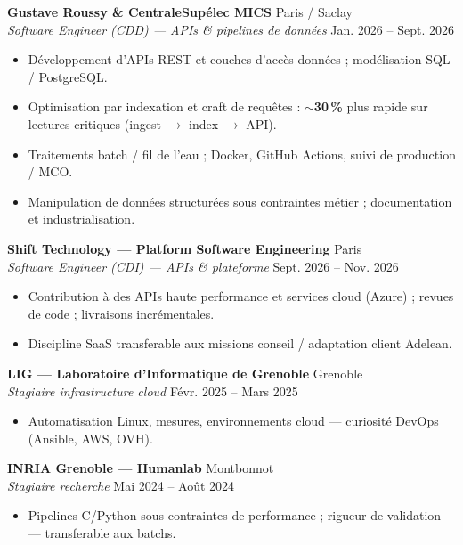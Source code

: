 \documentclass[10pt,a4paper]{article}
\begin{document}
\textbf{Gustave Roussy \& CentraleSup\'elec MICS} \hfill Paris / Saclay\\
\textit{Software Engineer (CDD) --- APIs \& pipelines de donn\'ees} \hfill Jan. 2026 -- Sept. 2026
\begin{itemize}
  \item D\'eveloppement d'APIs REST et couches d'acc\`es donn\'ees ; mod\'elisation SQL / PostgreSQL.
  \item Optimisation par indexation et craft de requ\^etes : $\sim$\textbf{30\,\%} plus rapide sur lectures critiques (ingest $\rightarrow$ index $\rightarrow$ API).
  \item Traitements batch / fil de l'eau ; Docker, GitHub Actions, suivi de production / MCO.
  \item Manipulation de donn\'ees structur\'ees sous contraintes m\'etier ; documentation et industrialisation.
\end{itemize}

\textbf{Shift Technology --- Platform Software Engineering} \hfill Paris\\
\textit{Software Engineer (CDI) --- APIs \& plateforme} \hfill Sept. 2026 -- Nov. 2026
\begin{itemize}
  \item Contribution \`a des APIs haute performance et services cloud (Azure) ; revues de code ; livraisons incr\'ementales.
  \item Discipline SaaS transferable aux missions conseil / adaptation client Adelean.
\end{itemize}

\textbf{LIG --- Laboratoire d'Informatique de Grenoble} \hfill Grenoble\\
\textit{Stagiaire infrastructure cloud} \hfill F\'evr. 2025 -- Mars 2025
\begin{itemize}
  \item Automatisation Linux, mesures, environnements cloud --- curiosit\'e DevOps (Ansible, AWS, OVH).
\end{itemize}

\textbf{INRIA Grenoble --- Humanlab} \hfill Montbonnot\\
\textit{Stagiaire recherche} \hfill Mai 2024 -- Ao\^ut 2024
\begin{itemize}
  \item Pipelines C/Python sous contraintes de performance ; rigueur de validation --- transferable aux batchs.
\end{itemize}
\end{document}
